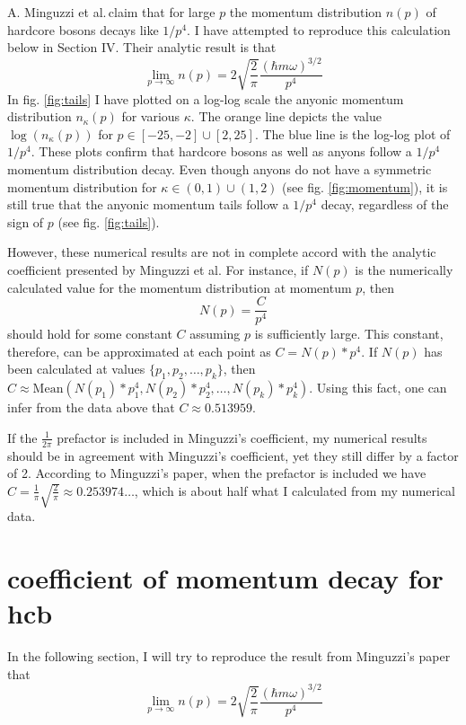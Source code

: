 \documentclass[onecolumn,english,aps,pra]{revtex4}
\begin{document}
A. Minguzzi et al.\footnotemark\,claim that for large $p$ the momentum distribution $n(p)$ of hardcore bosons decays like $1/p^4$. 
I have attempted to reproduce this calculation below in Section IV. Their analytic result is that
\[ \lim_{p \rightarrow \infty} n(p) = 2\sqrt{\frac{2}{\pi }} \frac{(\hbar m \omega)^{3/2}}{p^4}  \]
In fig. \ref{fig:tails} I have plotted on a log-log scale the anyonic momentum distribution $n_\kappa (p)$ for various $\kappa$. The orange line depicts the value $\log(n_\kappa(p))$ for $p \in [-25, -2] \cup [2,25]$. The blue line is the log-log plot of $1/p^4$. These plots confirm that hardcore bosons as well as anyons follow a $1/p^4$ momentum distribution decay. Even though anyons do not have a symmetric momentum distribution for $\kappa \in (0,1) \cup (1,2)$ (see fig. \ref{fig:momentum}), it is still true that the anyonic momentum tails follow a $1/p^4$ decay, regardless of the sign of $p$ (see fig. \ref{fig:tails}).

However, these numerical results are not in complete accord with the analytic coefficient presented by Minguzzi et al. For instance, if $N(p)$ is the numerically calculated value for the momentum distribution at momentum $p$, then
\[ N(p) = \dfrac{C}{p^4} \]
should hold for some constant $C$ assuming $p$ is sufficiently large. This constant, therefore, can be approximated at each point as $C = N(p) * p^4$. If $N(p)$ has been calculated at values $\{ p_{1},p_{2}, \ldots, p_{k} \}$, then $C \approx \text{Mean}(N(p_{1}) * p_{1}^4, N(p_{2}) * p_{2}^4, \ldots, N(p_{k}) * p_{k}^4) $. Using this fact, one can infer from the data above that $C \approx 0.513959 $. 

If the $\frac{1}{2\pi}$ prefactor is included in Minguzzi's coefficient, my numerical results should be in agreement with Minguzzi's coefficient, yet they still differ by a factor of 2. According to Minguzzi's paper, when the prefactor is included we have $C = \frac{1}{\pi} \sqrt{\frac{2}{\pi}} \approx 0.253974\ldots$, which is about half what I calculated from my numerical data.

\section{coefficient of momentum decay for hcb}

In the following section, I will try to reproduce the result from Minguzzi's paper that 
\[ \lim_{p \rightarrow \infty} n(p) = 2\sqrt{\frac{2}{\pi }} \frac{(\hbar m \omega)^{3/2}}{p^4}  \]
\end{document}
